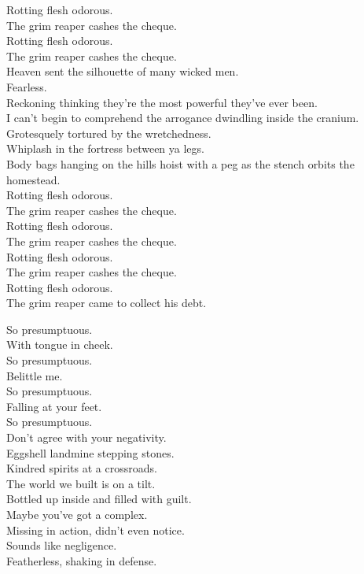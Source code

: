 Rotting flesh odorous. \\
The grim reaper cashes the cheque. \\
Rotting flesh odorous. \\
The grim reaper cashes the cheque. \\

Heaven sent the silhouette of many wicked men. \\
Fearless. \\
Reckoning thinking they're the most powerful they've ever been. \\
I can't begin to comprehend the arrogance dwindling inside the cranium. \\
Grotesquely tortured by the wretchedness. \\
Whiplash in the fortress between ya legs. \\
Body bags hanging on the hills hoist with a peg as the stench orbits the homestead. \\

Rotting flesh odorous. \\
The grim reaper cashes the cheque. \\
Rotting flesh odorous. \\
The grim reaper cashes the cheque. \\
Rotting flesh odorous. \\
The grim reaper cashes the cheque. \\
Rotting flesh odorous. \\
The grim reaper came to collect his debt. \\




So presumptuous. \\
With tongue in cheek. \\
So presumptuous. \\
Belittle me. \\
So presumptuous. \\
Falling at your feet. \\
So presumptuous. \\
Don't agree with your negativity. \\

Eggshell landmine stepping stones. \\
Kindred spirits at a crossroads. \\
The world we built is on a tilt. \\
Bottled up inside and filled with guilt. \\
Maybe you've got a  complex. \\
Missing in action, didn't even notice. \\
Sounds like negligence. \\
Featherless, shaking in defense. \\


